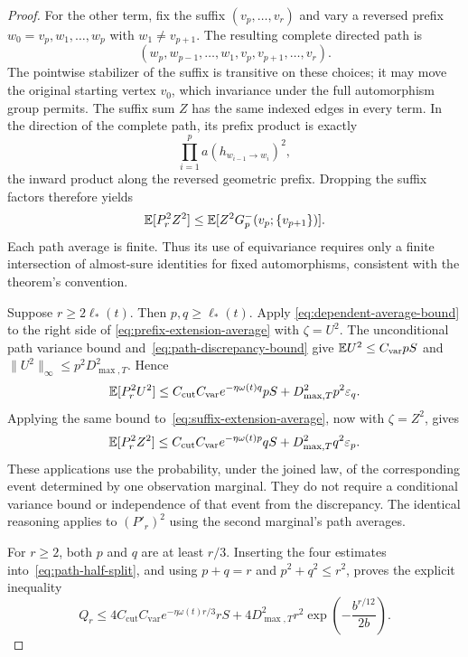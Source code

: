\begin{proof}
For the other term, fix the suffix $(v_p,\ldots,v_r)$ and vary a
reversed prefix $w_0=v_p,w_1,\ldots,w_p$ with $w_1\ne v_{p+1}$.
The resulting complete directed path is
\[
 (w_p,w_{p-1},\ldots,w_1,v_p,v_{p+1},\ldots,v_r).
\]
The pointwise stabilizer of the suffix is transitive on these choices;
it may move the original starting vertex $v_0$, which invariance under
the full automorphism group permits.  The suffix sum $Z$ has the same indexed edges
in every term.  In the direction of the complete path, its prefix
product is exactly
\[
 \prod_{i=1}^p a(h_{w_{i-1}\to w_i})^2,
\]
the inward product along the reversed geometric prefix.  Dropping
the suffix factors therefore yields
\begin{equation}
 \mathbb E[P_r^2Z^2]
       \le\mathbb E[Z^2G_p^-(v_p;\{v_{p+1}\})].
 \label{eq:suffix-extension-average}
\end{equation}
Each path average is finite.  Thus its use of equivariance
requires only a finite intersection of almost-sure identities for
fixed automorphisms, consistent with the theorem's convention.



Suppose $r\ge2\ell_*(t)$.  Then $p,q\ge\ell_*(t)$.  Apply
\eqref{eq:dependent-average-bound} to the right side of
\eqref{eq:prefix-extension-average} with $\zeta=U^2$.  The
unconditional path variance bound and~\eqref{eq:path-discrepancy-bound}
give
$\mathbb E U^2\le C_{\mathrm{var}}pS$ and
$\|U^2\|_\infty\le p^2D_{\max,T}^2$.  Hence
\begin{equation}
 \mathbb E[P_r^2U^2]
 \le C_{\mathrm{cut}}C_{\mathrm{var}}
          e^{-\eta\omega(t)q}pS+D_{\max,T}^2p^2\varepsilon_q.
 \label{eq:weighted-prefix}
\end{equation}
Applying the same bound to~\eqref{eq:suffix-extension-average}, now
with $\zeta=Z^2$, gives
\begin{equation}
 \mathbb E[P_r^2Z^2]
 \le C_{\mathrm{cut}}C_{\mathrm{var}}
          e^{-\eta\omega(t)p}qS+D_{\max,T}^2q^2\varepsilon_p.
 \label{eq:weighted-suffix}
\end{equation}
These applications use the probability, under the joined law, of the
corresponding event determined by one observation marginal.  They do not
require a conditional variance bound or independence of that event
from the discrepancy.  The identical reasoning applies to $(P'_r)^2$
using the second marginal's path averages.

For $r\ge2$, both $p$ and $q$ are at least $r/3$.  Inserting the
four estimates into~\eqref{eq:path-half-split}, and using
$p+q=r$ and $p^2+q^2\le r^2$, proves the explicit inequality
\begin{equation}
 Q_r\le4C_{\mathrm{cut}}C_{\mathrm{var}}
             e^{-\eta\omega(t)r/3}rS
       +4D_{\max,T}^2r^2
             \exp\left(-\frac{b^{r/12}}{2b}\right).
 \label{eq:weighted-path-explicit}
\end{equation}


\end{proof}
